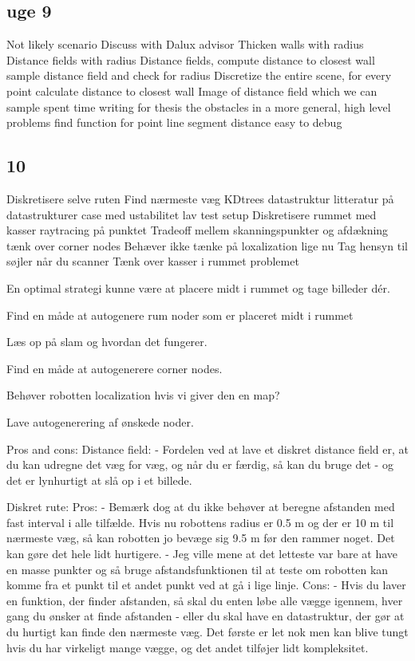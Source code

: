 \subsection{uge 9}
Not likely scenario 
Discuss with Dalux advisor 
Thicken walls with radius
Distance fields with radius
Distance fields, compute distance to closest wall
sample distance field and check for radius
Discretize the entire scene, for every point calculate distance to closest wall
Image of distance field which we can sample
spent time writing for thesis the obstacles in a more general, high level problems
find function for point line segment distance 
easy to debug

\subsection{10}
Diskretisere selve ruten
Find nærmeste væg 
KDtrees datastruktur 
litteratur på datastrukturer
case med ustabilitet
lav test setup
Diskretisere rummet med kasser
raytracing på punktet
Tradeoff mellem skanningspunkter og afdækning
tænk over corner nodes
Behæver ikke tænke på loxalization lige nu
Tag hensyn til søjler når du scanner 
Tænk over kasser i rummet problemet

En optimal strategi kunne være at placere midt i rummet og tage billeder dér.

Find en måde at autogenere rum noder som er placeret midt i rummet

Læs op på slam og hvordan det fungerer.

Find en måde at autogenerere corner nodes.

Behøver robotten localization hvis vi giver den en map?

Lave autogenerering af ønskede noder.

Pros and cons: 
Distance field:
- Fordelen ved at lave et diskret distance field er, at du kan udregne det væg for væg, og når du er færdig, så kan du bruge det - og det er lynhurtigt at slå op i et billede.

Diskret rute:
Pros:
- Bemærk dog at du ikke behøver at beregne afstanden med fast interval i alle tilfælde. Hvis nu robottens radius er 0.5 m og der er 10 m til nærmeste væg, så kan robotten jo bevæge sig 9.5 m før den rammer noget. Det kan gøre det hele lidt hurtigere.
- Jeg ville mene at det letteste var bare at have en masse punkter og så bruge afstandsfunktionen til at teste om robotten kan komme fra et punkt til et andet punkt ved at gå i lige linje.
Cons:
- Hvis du laver en funktion, der finder afstanden, så skal du enten løbe alle vægge igennem, hver gang du ønsker at finde afstanden - eller du skal have en datastruktur, der gør at du hurtigt kan finde den nærmeste væg. Det første er let nok men kan blive tungt hvis du har virkeligt mange vægge, og det andet tilføjer lidt kompleksitet.



